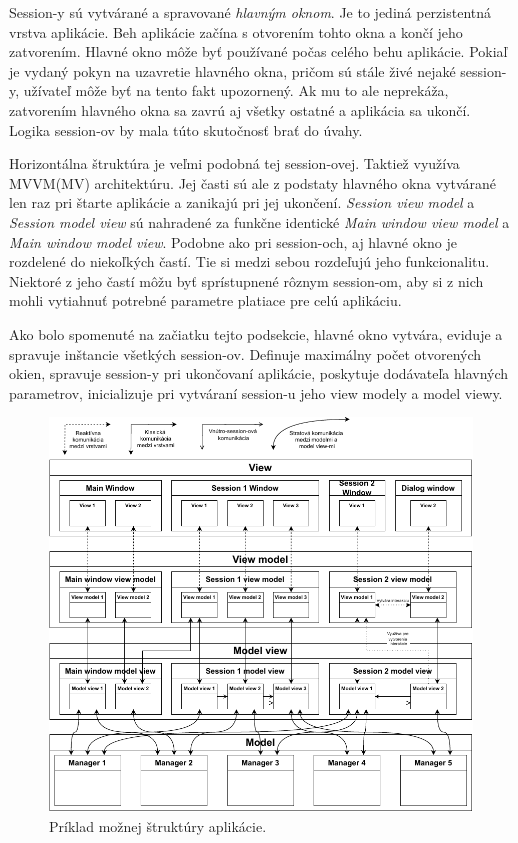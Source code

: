 Session-y sú vytvárané a spravované \textit{hlavným oknom}. Je to jediná perzistentná  vrstva aplikácie. Beh aplikácie začína s otvorením tohto okna a končí jeho zatvorením. Hlavné okno môže byť používané počas celého behu aplikácie. Pokiaľ je vydaný pokyn na uzavretie hlavného okna, pričom sú stále živé nejaké session-y, užívateľ môže byť na tento fakt upozornený. Ak mu to ale neprekáža, zatvorením hlavného okna sa zavrú aj všetky ostatné a aplikácia sa ukončí. Logika session-ov by mala túto skutočnosť brať do úvahy.

Horizontálna štruktúra je veľmi podobná tej session-ovej. Taktiež využíva MVVM(MV) architektúru. Jej časti sú ale z podstaty hlavného okna vytvárané len raz pri štarte aplikácie a zanikajú pri jej ukončení. \textit{Session view model} a \textit{Session model view} sú nahradené za funkčne identické \textit{Main window view model} a \textit{Main window model view}. Podobne ako pri session-och, aj hlavné okno je rozdelené do niekoľkých častí. Tie si medzi sebou rozdeľujú jeho funkcionalitu. Niektoré z jeho častí môžu byť sprístupnené rôznym session-om, aby si z nich mohli vytiahnuť potrebné parametre platiace pre celú aplikáciu.     

Ako bolo spomenuté na začiatku tejto podsekcie, hlavné okno vytvára, eviduje a spravuje inštancie všetkých session-ov. Definuje maximálny počet otvorených okien, spravuje session-y pri ukončovaní aplikácie, poskytuje dodávateľa hlavných parametrov, inicializuje pri vytváraní session-u jeho view modely a model viewy.  

\begin{figure}[p]\centering
\includegraphics[]{img/priklad_struktury}
\caption{Príklad možnej  štruktúry aplikácie.} 
\label{obr02:priklad_struktury}
\end{figure}
